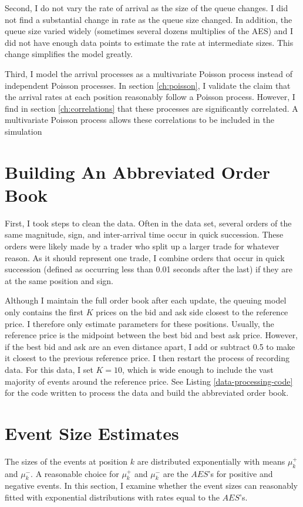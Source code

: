 Second, I do not vary the rate of arrival as the size of the queue changes. I did not find a substantial change in rate as the queue size changed. In addition, the queue size varied widely (sometimes several dozens multiplies of the AES) and I did not have enough data points to estimate the rate at intermediate sizes. This change simplifies the model greatly.

Third, I model the arrival processes as a multivariate Poisson process instead of independent Poisson processes. In section \ref{ch:poisson}, I validate the claim that the arrival rates at each position reasonably follow a Poisson process. However, I find in section \ref{ch:correlations} that these processes are significantly correlated. A multivariate Poisson process allows these correlations to be included in the simulation

\section{Building An Abbreviated Order Book}
First, I took steps to clean the data. Often in the data set, several orders of the same magnitude, sign, and inter-arrival time occur in quick succession. These orders were likely made by a trader who split up a larger trade for whatever reason. As it should represent one trade, I combine orders that occur in quick succession (defined as occurring less than 0.01 seconds after the last) if they are at the same position and sign. 

Although I maintain the full order book after each update, the queuing model only contains the first $K$ prices on the bid and ask side closest to the reference price. I therefore only estimate parameters for these positions. Usually, the reference price is the midpoint between the best bid and best ask price. However, if the best bid and ask are an even distance apart, I add or subtract 0.5 to make it closest to the previous reference price. I then restart the process of recording data. For this data, I set $K=10$, which is wide enough to include the vast majority of events around the reference price. See Listing \ref{data-processing-code} for the code written to process the data and build the abbreviated order book.

\section{Event Size Estimates}\label{ch:event_sizes}
The sizes of the events at position $k$ are distributed exponentially with means $\mu^+_k$ and $\mu^-_k$. A reasonable choice for $\mu^+_k$ and $\mu^-_k$ are the $AES$'s for positive and negative events. In this section, I examine whether the event sizes can reasonably fitted with exponential distributions with rates equal to the $AES$'s. 

